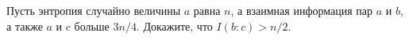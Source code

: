 Пусть энтропия случайно величины $a$ равна $n$, а взаимная информация пар $a$ и $b$, а также $a$ и $c$
больше $3n / 4$. Докажите, что $I(b : c) > n / 2$.

